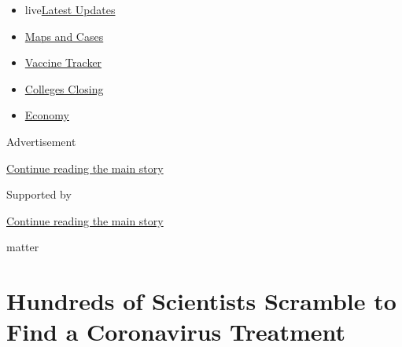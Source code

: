 \begin{itemize}
\tightlist
\item
  live\href{https://www.nytimes3xbfgragh.onion/2020/08/21/world/covid-19-coronavirus.html?name=styln-coronavirus-national\&region=TOP_BANNER\&variant=undefined\&block=storyline_menu_recirc\&action=click\&pgtype=Article\&impression_id=31a0ea40-e3b0-11ea-b605-f71bd33d99de}{Latest
  Updates}
\item
  \href{https://www.nytimes3xbfgragh.onion/interactive/2020/us/coronavirus-us-cases.html?name=styln-coronavirus-national\&region=TOP_BANNER\&variant=undefined\&block=storyline_menu_recirc\&action=click\&pgtype=Article\&impression_id=31a0ea41-e3b0-11ea-b605-f71bd33d99de}{Maps
  and Cases}
\item
  \href{https://www.nytimes3xbfgragh.onion/interactive/2020/science/coronavirus-vaccine-tracker.html?name=styln-coronavirus-national\&region=TOP_BANNER\&variant=undefined\&block=storyline_menu_recirc\&action=click\&pgtype=Article\&impression_id=31a0ea42-e3b0-11ea-b605-f71bd33d99de}{Vaccine
  Tracker}
\item
  \href{https://www.nytimes3xbfgragh.onion/2020/08/19/us/colleges-closing-covid.html?name=styln-coronavirus-national\&region=TOP_BANNER\&variant=undefined\&block=storyline_menu_recirc\&action=click\&pgtype=Article\&impression_id=31a0ea43-e3b0-11ea-b605-f71bd33d99de}{Colleges
  Closing}
\item
  \href{https://www.nytimes3xbfgragh.onion/live/2020/08/21/business/stock-market-today-coronavirus?name=styln-coronavirus-national\&region=TOP_BANNER\&variant=undefined\&block=storyline_menu_recirc\&action=click\&pgtype=Article\&impression_id=31a0ea44-e3b0-11ea-b605-f71bd33d99de}{Economy}
\end{itemize}

Advertisement

\protect\hyperlink{after-top}{Continue reading the main story}

Supported by

\protect\hyperlink{after-sponsor}{Continue reading the main story}

matter

\hypertarget{hundreds-of-scientists-scramble-to-find-a-coronavirus-treatment}{%
\section{Hundreds of Scientists Scramble to Find a Coronavirus
Treatment}\label{hundreds-of-scientists-scramble-to-find-a-coronavirus-treatment}}

